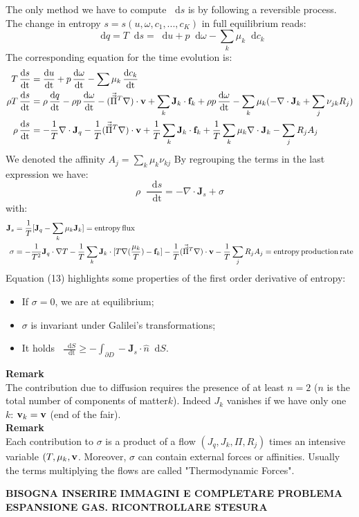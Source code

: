 \documentclass{article}
\newcommand*\diff{\mathop{}\!\mathrm{d}}
\newcommand*\Tder[1]{\mathop{}\!\frac{\diff #1}{\diff \mathrm{t}}}
\begin{document}
The only method we have to compute $\diff{s}$ is by following a reversible process. The change in entropy $s = s(u,\omega,c_1,...,c_K)$ in full equilibrium reads:
$$\diff{q} = T\diff{s} = \diff{u} +p \diff{\omega} -\sum_k \mu_k \diff{c_k}$$
The corresponding equation for the time evolution is:
\begin{equation*}
    \begin{aligned}
        T\Tder{s} &= \Tder{u} + p\Tder{\omega} - \sum \mu_k \Tder{c_k}\\
        \rho T \Tder{s} &=\rho \Tder{q} - \rho p\Tder{\omega} - (\Vec{\Vec{\Pi}}^T \nabla ) \cdot \v_v +\sum_k \mathbf{J}_k \cdot \mathbf{f}_k + \rho p\Tder{\omega} -\sum_k \mu_k (-\nabla \cdot \mathbf{J}_k + \sum_j \nu_{jk}R_j ) \\
        \rho \Tder{s} &= -\frac{1}{T}  \nabla \cdot \mathbf{J}_q - \frac{1}{T}(\Vec{\Vec{\Pi}}^T \nabla) \cdot \v_v +\frac{1}{T}\sum_k \mathbf{J}_k \cdot \mathbf{f}_k + \frac{1}{T}\sum_k \mu_k\nabla \cdot \mathbf{J}_k  -\sum_j R_j A_j
    \end{aligned}
\end{equation*}
We denoted the affinity $A_j = \sum_k \mu_k \nu_{kj}$ By regrouping the terms in the last expression we have:
\begin{equation}
    \rho \Tder{s } = -\nabla \cdot \mathbf{J}_s +\sigma
\end{equation}
with:
\begin{equation*}
    \begin{aligned}
    \mathbf{J}_s &= \frac{1}{T} [\mathbf{J}_q - \sum_k\mu_k \mathbf{J}_k] = \mathrm{entropy \, flux} \\ 
    \sigma &= -\frac{1}{T^2} \mathbf{J}_q \cdot \nabla T -\frac{1}{T} \sum_k \mathbf{J}_k \cdot [T\nabla (\frac{\mu_k}{T}) - \mathbf{f}_k] -\frac{1}{T} (\Vec{\Vec{\Pi}}^T \nabla)\cdot \v_v -\frac{1}{T}\sum_j R_j A_j =\mathrm{entropy \, production\, rate}            \end{aligned}
\end{equation*}
Equation (13) highlights some properties of the first order derivative of entropy:
\begin{itemize}
    \item If $\sigma = 0$, we are at equilibrium;
    \item $\sigma$ is invariant under Galilei's transformations;
    \item It holds $\Tder{S} \ge -\int_{\partial D} -\mathbf{J}_s \cdot \hat{n} \diff{S}$.
\end{itemize}
\textbf{Remark}\\
The contribution due to diffusion requires the presence of at least $n = 2$ ($n$ is the total number of components of matter$k$). Indeed $J_k$ vanishes if we have only one $k$: $\v_v_k = \v_v$ (end of the fair).\\
\textbf{Remark}\\
Each contribution to $\sigma$ is a product of a flow $(J_q,J_k,\Pi, R_j )$ times an intensive variable $(T, \mu_k,\v_v$. Moreover, $\sigma$ can contain external forces or affinities. Usually the terms multiplying the flows are called "Thermodynamic Forces".


\textbf{BISOGNA INSERIRE IMMAGINI E COMPLETARE PROBLEMA ESPANSIONE GAS. RICONTROLLARE STESURA}
\end{document}
